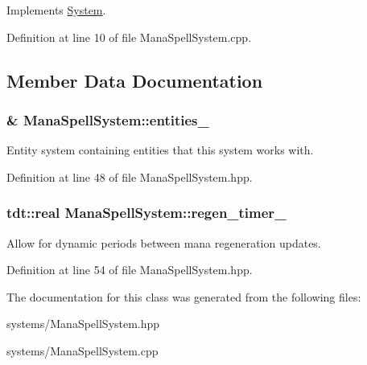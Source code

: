 Implements \hyperlink{class_system_a6d54c9bd38eb43d620a1451cb0925472}{System}.



Definition at line 10 of file Mana\+Spell\+System.\+cpp.



\subsection{Member Data Documentation}
\subsubsection[{\texorpdfstring{entities\+\_\+}{entities_}}]{\& Mana\+Spell\+System\+::entities\+\_\+\hspace{0.3cm}{\ttfamily [private]}}\hypertarget{class_mana_spell_system_a907a818e62304a34d411c428e8989ee3}{}\label{class_mana_spell_system_a907a818e62304a34d411c428e8989ee3}


Entity system containing entities that this system works with. 



Definition at line 48 of file Mana\+Spell\+System.\+hpp.

\subsubsection[{\texorpdfstring{regen\+\_\+timer\+\_\+}{regen_timer_}}]{\setlength{\rightskip}{0pt plus 5cm}tdt\+::real Mana\+Spell\+System\+::regen\+\_\+timer\+\_\+\hspace{0.3cm}{\ttfamily [private]}}\hypertarget{class_mana_spell_system_a01b27fb864d1dd85425acb87e7928129}{}\label{class_mana_spell_system_a01b27fb864d1dd85425acb87e7928129}


Allow for dynamic periods between mana regeneration updates. 



Definition at line 54 of file Mana\+Spell\+System.\+hpp.



The documentation for this class was generated from the following files\+:\begin{DoxyCompactItemize}
\item 
systems/Mana\+Spell\+System.\+hpp\item 
systems/Mana\+Spell\+System.\+cpp\end{DoxyCompactItemize}
